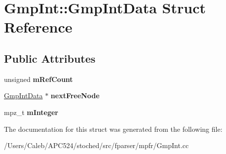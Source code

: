 \hypertarget{struct_gmp_int_1_1_gmp_int_data}{}\section{Gmp\+Int\+:\+:Gmp\+Int\+Data Struct Reference}
\label{struct_gmp_int_1_1_gmp_int_data}
\subsection*{Public Attributes}
\begin{DoxyCompactItemize}
\item 
\mbox{\label{struct_gmp_int_1_1_gmp_int_data_ad3f0e1a55b2cf5b0402c155c528cbd53}} 
unsigned {\bfseries m\+Ref\+Count}
\item 
\mbox{\label{struct_gmp_int_1_1_gmp_int_data_a1f0d48b928272931a8d648aeec256917}} 
\hyperlink{struct_gmp_int_1_1_gmp_int_data}{Gmp\+Int\+Data} $\ast$ {\bfseries next\+Free\+Node}
\item 
\mbox{\label{struct_gmp_int_1_1_gmp_int_data_a208a3eb034167f1dd8b57aa3c70c96be}} 
mpz\+\_\+t {\bfseries m\+Integer}
\end{DoxyCompactItemize}


The documentation for this struct was generated from the following file\+:\begin{DoxyCompactItemize}
\item 
/\+Users/\+Caleb/\+A\+P\+C524/stoched/src/fparser/mpfr/Gmp\+Int.\+cc\end{DoxyCompactItemize}

